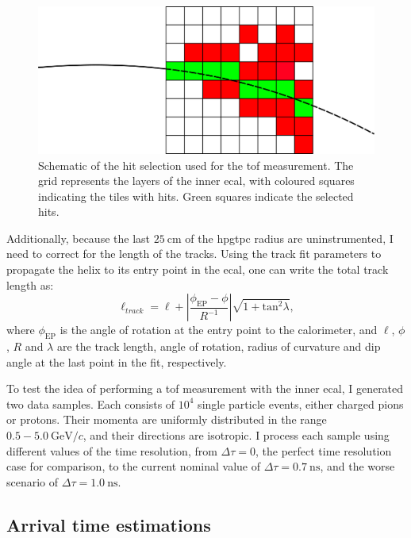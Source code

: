 \begin{figure}[t]
	\centering
	\includegraphics[width=.75\linewidth]{Images/GArSoft_PID/tof/tof_diagram.png}
	\caption[Schematic diagram of the hit selection used for the \gls{ecal} \gls{tof} measurement.]{Schematic of the hit selection used for the \gls{tof} measurement. The grid represents the layers of the inner \gls{ecal}, with coloured squares indicating the tiles with hits. Green squares indicate the selected hits.}
	\label{fig:tof_diagram}
\end{figure}

Additionally, because the last $25~\mathrm{cm}$ of the \gls{hpgtpc} radius are uninstrumented, I need to correct for the length of the tracks. Using the track fit parameters to propagate the helix to its entry point in the \gls{ecal}, one can write the total track length as:
\begin{equation}
	\ell_{track} = \ell + \left| \frac{\phi_{\mathrm{EP}} - \phi}{R^{-1}} \right| \sqrt{1+\mathrm{tan}^{2}\lambda},
\end{equation}
where $\phi_{\mathrm{EP}}$ is the angle of rotation at the entry point to the calorimeter, and $\ell$, $\phi$, $R$ and $\lambda$ are the track length, angle of rotation, radius of curvature and dip angle at the last point in the fit, respectively.

To test the idea of performing a \gls{tof} measurement with the inner \gls{ecal}, I generated two data samples. Each consists of $10^{4}$ single particle events, either charged pions or protons. Their momenta are uniformly distributed in the range $0.5-5.0~\mathrm{GeV}/c$, and their directions are isotropic. I process each sample using different values of the time resolution, from $\Delta \tau = 0$, the perfect time resolution case for comparison, to the current nominal value of $\Delta \tau = 0.7~\mathrm{ns}$, and the worse scenario of $\Delta \tau = 1.0~\mathrm{ns}$.

\subsection{Arrival time estimations}

